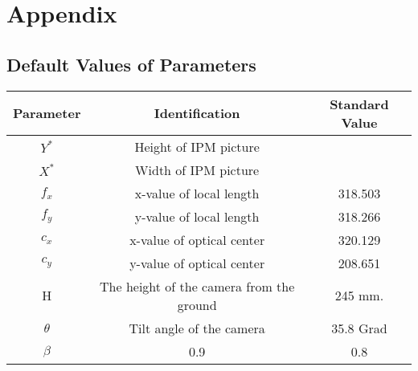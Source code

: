 %
\appendix 
\chapter{Appendix} 
\section{Default Values of Parameters} 


\begin{center}
  \begin{tabular}{ | c | c | c | }
    \hline
    Parameter & Identification				 			 &  Standard Value   \\ \hline
    $ Y^{*} $ & Height of IPM picture  			    	 &     \\ \hline
    $ X^{*} $ & Width of IPM picture  		  			 &    \\ \hline
    $ f_{x} $ & x-value of local length 			     &  318.503  \\ \hline
    $ f_{y} $ & y-value of local length 			     &  318.266  \\ \hline
    $ c_{x} $ & x-value of optical center			     &  320.129  \\ \hline
    $ c_{y} $ & y-value of optical center	  			 &  208.651  \\ \hline
    H		  & The height of the camera from the ground &  245 mm.  \\ \hline
    $ \theta $& Tilt angle of the camera      			 &  35.8 Grad  \\ \hline
    $ \beta $ & 0.9 									 &  0.8  \\ \hline


  \end{tabular}
  \label{tab:parameters}
\end{center}

%